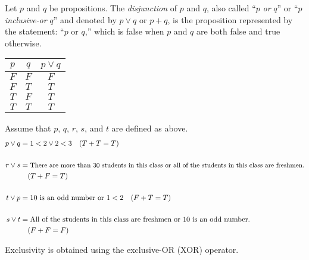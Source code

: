 \documentclass[letterpaper,12pt,fleqn]{article}
\begin{document}
\begin{definition}[Disjunction]
  Let \(p\) and \(q\) be propositions.  The \emph{disjunction} of \(p\) and \(q\), also called ``\(p\) \emph{or}
  \(q\)'' or ``\(p\) \emph{inclusive-or} \(q\)'' and denoted by \(p\lor q\) or \(p+q\), is the proposition
  represented by the statement: ``\(p\) or \(q\),'' which is false when \(p\) and \(q\) are both false and true
  otherwise.

  \begin{center}
    \begin{tabular}{|cc|c|}
      \hline
      \(p\) & \(q\) & \(p\lor q\) \\
      \hline
      \(F\) & \(F\) & \(F\) \\
      \hline
      \(F\) & \(T\) & \(T\) \\
      \hline
      \(T\) & \(F\) & \(T\) \\
      \hline
      \(T\) & \(T\) & \(T\) \\
      \hline
    \end{tabular}
  \end{center}
\end{definition}

\begin{examples}
  Assume that \(p\), \(q\), \(r\), \(s\), and \(t\) are defined as above.
  \begin{align*}
    p\lor q &= 1<2\lor 2<3\quad(T+T=T) \\
    \\
    r\lor s &= \text{\small There are more than 30 students in this class or all of the students in this
      class are freshmen.} \\
    & \quad(T+F=T) \\
    \\
    t\lor p &= 10\ \text{is an odd number or}\ 1<2\quad(F+T=T) \\
    \\
    s\lor t &= \text{All of the students in this class are freshmen or}\ 10\ \text{is an odd number.} \\
    & \quad(F+F=F)
  \end{align*}
\end{examples}

Exclusivity is obtained using the exclusive-OR (XOR) operator.
\end{document}
